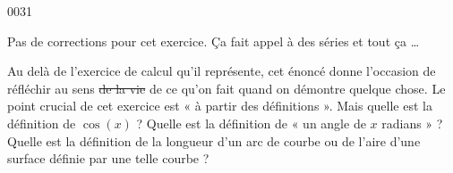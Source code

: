 
\begin{corrige}{0031}

Pas de corrections pour cet exercice. Ça fait appel à des séries et tout ça \ldots

 Au delà de l'exercice de calcul qu'il représente, cet énoncé donne l'occasion de réfléchir au sens \sout{de la vie} de ce qu'on fait quand on démontre quelque chose. Le point crucial de cet exercice est « à partir des définitions ». Mais quelle est la définition de $\cos(x)$ ? Quelle est la définition de « un angle de $x$ radians » ? Quelle est la définition de la longueur d'un arc de courbe ou de l'aire d'une surface définie par une telle courbe ?

\end{corrige}
